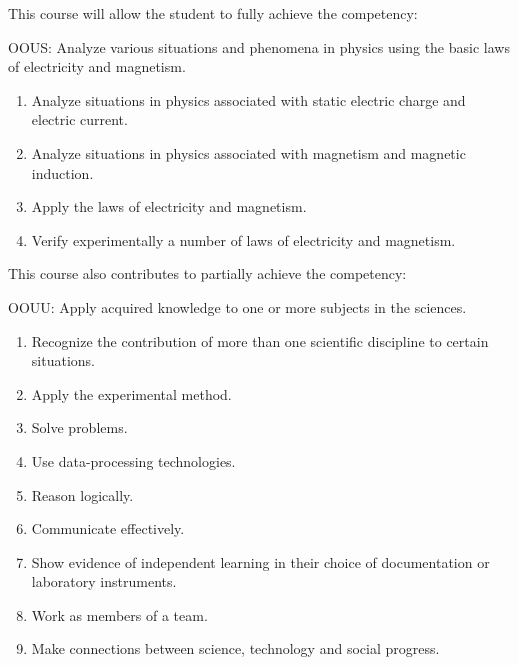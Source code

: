 {This course will allow the student to fully achieve the competency:

OOUS: Analyze various situations and phenomena in physics using the basic laws of electricity and magnetism.
\begin{enumerate}
\item Analyze situations in physics associated with static electric charge and electric current.
\item Analyze situations in physics associated with magnetism and magnetic induction.
\item Apply the laws of electricity and magnetism.
\item Verify experimentally a number of laws of electricity and magnetism.
\end{enumerate}
\smallskip
This course also contributes to partially achieve the competency:

OOUU:	Apply acquired knowledge to one or more subjects in the sciences.
\begin{enumerate}
\item Recognize the contribution of more than one scientific discipline to certain situations.
\item Apply the experimental method.
\item Solve problems.
\item Use data-processing technologies.
\item Reason logically.
\item Communicate effectively.
\item Show evidence of independent learning in their choice of documentation or laboratory instruments.
\item Work as members of a team.
\item Make connections between science, technology and social progress.
\end{enumerate}
}

